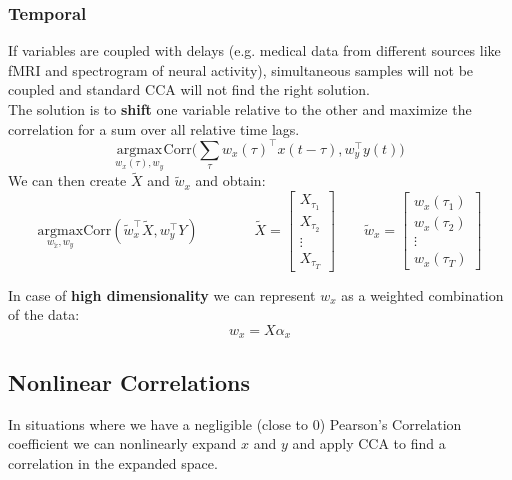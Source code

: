 \subsubsection{Temporal}
If variables are coupled with delays (e.g. medical data from different sources like fMRI and spectrogram of neural activity), simultaneous samples will not be coupled and standard CCA will not find the right solution.\\
The solution is to \textbf{shift} one variable relative to the other and maximize the correlation for a sum over all relative time lags.
\begin{equation}
	\underset{w_x(\tau), w_y}{\text{argmax}} \text{Corr}\bigg(\sum_\tau w_x(\tau)^\top x(t-\tau), w_y^\top y(t)\bigg)
\end{equation}
We can then create $\tilde{X}$ and $\tilde{w}_x$ and obtain:
\begin{equation}
	\underset{w_{\tilde{x}}, w_y}{\text{argmax}} \text{Corr}(\tilde{w}_x^\top \tilde{X}, w_y^\top Y) \qquad\qquad \tilde{X} = \begin{bmatrix}
		X_{\tau_1} \\ X_{\tau_2} \\ \vdots \\ X_{\tau_T}
	\end{bmatrix} \qquad
	\tilde{w}_x = \begin{bmatrix}
		w_x(\tau_1) \\ w_x(\tau_2) \\ \vdots \\ w_x(\tau_T)
	\end{bmatrix}
\end{equation}

\begin{note}
	In case of \textbf{high dimensionality} we can represent $w_x$ as a weighted combination of the data:
	\begin{equation}
		w_x = X\alpha_x
	\end{equation}
\end{note}

\subsection{Nonlinear Correlations}
In situations where we have a negligible (close to $0$) Pearson's Correlation coefficient we can nonlinearly expand $x$ and $y$ and apply CCA to find a correlation in the expanded space.

